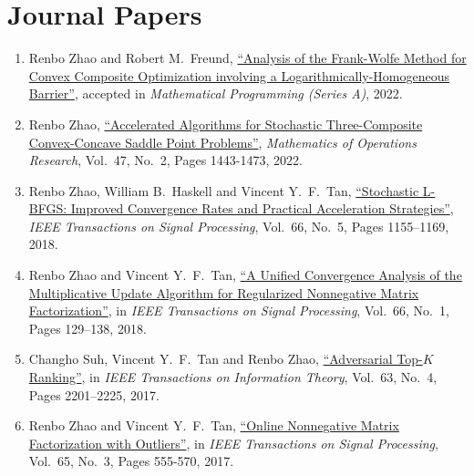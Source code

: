 \documentclass[11pt]{article}
\newcommand{\TSP}{IEEE Transactions on Signal Processing}
\newcommand{\TIT}{IEEE Transactions on Information Theory}
\newcommand{\MOR}{Mathematics of Operations Research}
\newcommand{\MPA}{Mathematical Programming (Series A)}
\begin{document}

\section*{\large Journal Papers}

\begin{enumerate}[label=J\arabic*.]\setlength{\leftskip}{2ex}
\item Renbo Zhao and Robert M.\ Freund,  \href{https://link.springer.com/article/10.1007/s10107-022-01820-9}{``Analysis of the Frank-Wolfe Method for Convex Composite Optimization involving a Logarithmically-Homogeneous Barrier''},  accepted in {\em \MPA}, 2022.
\item {Renbo Zhao},  \href{https://pubsonline.informs.org/doi/abs/10.1287/moor.2021.1175?journalCode=moor}{``Accelerated Algorithms for Stochastic Three-Composite Convex-Concave Saddle Point Problems''},  {\em \MOR}, Vol.\ 47, No.\ 2, Pages 1443-1473, 2022.
\item {Renbo Zhao}, William B.\ Haskell and Vincent Y.\ F.\ Tan,  \href{https://ieeexplore.ieee.org/document/8219748}{``Stochastic L-BFGS: Improved Convergence Rates and Practical Acceleration Strategies''},    {\em \TSP}, Vol.\ 66, No.\ 5, Pages 1155–1169, 2018.
\item {Renbo Zhao} and Vincent Y.\ F.\ Tan,   \href{https://ieeexplore.ieee.org/document/8052526}{``A Unified Convergence Analysis of the Multiplicative Update Algorithm for Regularized Nonnegative Matrix Factorization''},  in {\em \TSP}, Vol.\ 66, No.\ 1, Pages 129–138, 2018.
\item Changho Suh, Vincent Y.\ F.\ Tan and {Renbo Zhao},   \href{https://ieeexplore.ieee.org/document/7835206}{``Adversarial Top-$K$ Ranking''},   in {\em \TIT}, Vol.\ 63, No.\ 4, Pages 2201–2225, 2017.
\item {Renbo Zhao} and Vincent Y.\ F.\ Tan,   \href{https://ieeexplore.ieee.org/document/7676413}{``Online Nonnegative Matrix Factorization with Outliers''},  in {\em \TSP}, Vol.\ 65, No.\ 3, Pages 555-570, 2017. 

\end{enumerate}
\end{document}
